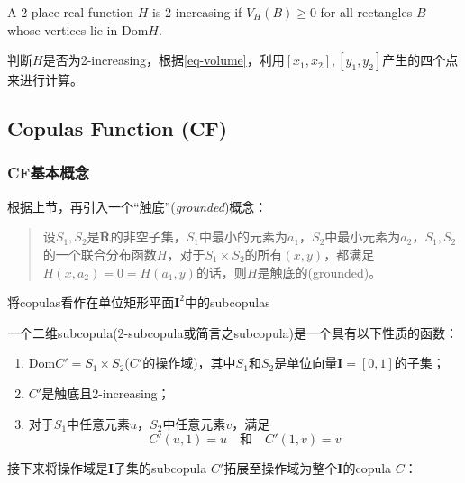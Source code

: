 \begin{definition}
    A 2-place real function $H$ is 2-increasing if $V_H(B) \geq 0$ for all rectangles $B$ whose vertices lie in Dom$H$.
    \label{def2.1.2}
\end{definition}

判断$H$是否为2-increasing，根据\cref{eq-volume}，利用$[x_1,x_2],[y_1,y_2]$产生的四个点来进行计算。


\subsection{Copulas Function (CF)}
\subsubsection{CF基本概念}\cite{Bill2000An}
根据上节，再引入一个``触底''(\emph{\textcolor[rgb]{1,0,0}{grounded}})概念：
\begin{quotation}
    设$S_1,S_2$是$\bar{\mathbf{R}}$的非空子集，$S_1$中最小的元素为$a_1$，$S_2$中最小元素为$a_2$，$S_1,S_2$的一个联合分布函数$H$，对于$S_1 \times S_2$的所有$(x,y)$，都满足$H(x,a_2)=0=H(a_1,y)$的话，则$H$是触底的(grounded)。
\end{quotation}

将copulas看作在单位矩形平面$\mathbf{I}^2$中的subcopulas
\begin{definition}
    一个二维subcopula(2-subcopula或简言之subcopula)是一个具有以下性质的函数：
    \begin{enumerate}[1.]
        \item Dom$C' = S_1 \times S_2$($C'$的操作域)，其中$S_1$和$S_2$是单位向量$\mathbf{I}=[0,1]$的子集；
        \item $C'$是触底且2-increasing；
        \item 对于$S_1$中任意元素$u$，$S_2$中任意元素$v$，满足
            \begin{equation}
                C'(u,1) = u \quad \text{和} \quad C'(1,v) = v
                \label{eq-subcopula}
            \end{equation}
    \end{enumerate}
    \label{def2.2.1}
\end{definition}


接下来将操作域是$\mathbf{I}$子集的subcopula $C'$拓展至操作域为整个$\mathbf{I}$的copula $C$：


